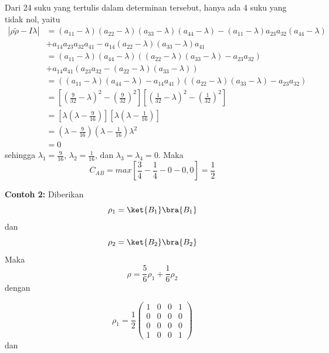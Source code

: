 Dari 24 suku yang tertulis dalam determinan tersebut, hanya ada 4 suku yang tidak nol, yaitu
\begin{equation}
	\begin{aligned}
		|\rho \tilde{\rho}-I\lambda|
		&=(a_{11}-\lambda)(a_{22}-\lambda)(a_{33}-\lambda)(a_{44}-\lambda)-(a_{11}-\lambda)a_{23}a_{32}(a_{44}-\lambda)\\
		&+a_{14}a_{23}a_{32}a_{41}-a_{14}(a_{22}-\lambda)(a_{33}-\lambda)a_{41}\\
		&=(a_{11}-\lambda)(a_{44}-\lambda)((a_{22}-\lambda)(a_{33}-\lambda)-a_{23}a_{32})\\
		&+a_{14}a_{41}(a_{23}a_{32}-(a_{22}-\lambda)(a_{33}-\lambda))\\
		&=((a_{11}-\lambda)(a_{44}-\lambda)-a_{14}a_{41})((a_{22}-\lambda)(a_{33}-\lambda)-a_{23}a_{32})\\
		&=[(\frac{9}{32}-\lambda)^2-(\frac{9}{32})^2][(\frac{1}{32}-\lambda)^2-(\frac{1}{32})^2]\\
		&=[\lambda(\lambda-\frac{9}{16})][\lambda(\lambda-\frac{1}{16})]\\
		&=(\lambda-\frac{9}{16})(\lambda-\frac{1}{16})\lambda^2\\
		&=0
	\end{aligned}
\end{equation}
sehingga $\lambda_1=\frac{9}{16}$, $\lambda_2=\frac{1}{16}$, dan $\lambda_3=\lambda_4=0$. Maka
\begin{equation}
	C_{AB}=max[\frac{3}{4}-\frac{1}{4}-0-0,0]=\frac{1}{2}
\end{equation}

\textbf{Contoh 2:}
Diberikan
\begin{equation}
	\rho_1 = \ket{B_1}\bra{B_1}
\end{equation}
dan
\begin{equation}
	\rho_2 = \ket{B_2}\bra{B_2}
\end{equation}
Maka
\begin{equation}
	\rho = \frac{5}{6}\rho_1 + \frac{1}{6}\rho_2
\end{equation}
dengan

\begin{equation}
	\rho_1 = \frac{1}{2}
	\begin{pmatrix}
		1&0&0&1\\
		0&0&0&0\\
		0&0&0&0\\
		1&0&0&1
	\end{pmatrix}
\end{equation}
dan

